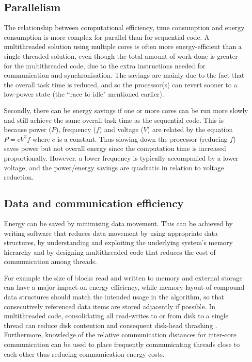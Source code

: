 \documentclass[oneside]{book}
\begin{document}
\subsection{Parallelism}

The relationship between computational efficiency, time consumption and energy consumption is more complex for parallel than for sequential code.  A multithreaded solution using multiple cores is often more energy-efficient than a single-threaded solution, even though the total amount of work done is greater for the multithreaded code, due to the extra instructions needed for communication and synchronisation. The savings are mainly due to the fact that the overall task time is reduced, and so the processor(s) can revert sooner to a low-power state (the ``race to idle" mentioned earlier).  

Secondly, there can be energy savings if one or more cores can be run more slowly and still achieve the same overall task time as the sequential code.  This is because power ($P$), frequency ($f$) and voltage ($V$) are related by the equation $P = c V^2 f$ where $c$ is a constant. Thus slowing down the processor (reducing $f$) saves power but not overall energy since the computation time is increased proportionally. However, a lower frequency is typically accompanied by a lower voltage, and the power/energy savings are quadratic in relation to voltage reduction.

\subsection{Data and communication efficiency}

Energy can be saved by minimising data movement. This can be achieved by writing software that reduces data movement by using appropriate data structures, by understanding and exploiting the underlying system's memory hierarchy and by designing multithreaded code that reduces the cost of communication among threads.  

For example the size of blocks read and written to memory and external storage can have a major impact on energy efficiency, while memory layout of compound data structures should match the intended usage in the algorithm, so that consecutively referenced data items are stored adjacently if possible.  In multithreaded code, consolidating all read-writes to or from disk to a single thread can reduce disk contention and consequent disk-head thrashing \cite{Steigerwald_Agrawal_2011}.  Furthermore, knowledge of the relative communication distances for inter-core communication can be used to place frequently communicating threads close to each other \cite{KerrisonSwallow15} thus reducing communication energy costs.
\end{document}
